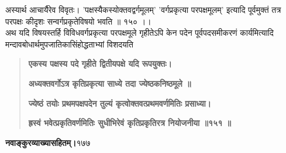 \documentclass[11pt, openany]{book}
\begin{document}
\begin{sloppypar}
\hangindent=0.2in \hspace{0.2in}अस्यार्थ आचार्यैरेव विवृतः। 'पक्षस्यैकस्योक्तवद्वर्गमूलम्' 'वर्गप्रकृत्या परपक्षमूलम्' इत्यादि पूर्वमुक्तं तत्र परपक्षः कीदृशः सन्वर्गप्रकृतेविषयो भवति ॥ १५० ।।\\

\hangindent=0.2in \hspace{0.2in}अथ यदि विषयस्तर्हि विविधवर्गप्रकृत्या परपक्षमूले गृहीतेऽपि केन पदेन पूर्वपदसमीकरणं कार्यमित्यादि मन्दावबोधार्थमुपजातिकासिंहोद्धताभ्यां विशदयति\textendash

\begin{quote}
\hspace{0.5in}\textbf{एकस्य पक्षस्य पदे गृहीते द्वितीयपक्षे यदि रूपयुक्तः।}

\hspace{0.5in}\textbf{अध्यक्तवर्गोऽत्र कृतिप्रकृत्या साध्ये तदा ज्येष्ठकनिष्ठमूले ॥}

\hspace{0.5in}\textbf{ज्येष्ठं तयोः प्रथमपक्षपदेन तुल्यं कृत्वोक्तवत्प्रथमवर्णमितिः प्रसाध्या।}

\hspace{0.4in}\textbf{ह्रस्वं भवेत्प्रकृतिवर्णमितिः सुधीभिरेवं कृतिप्रकृतिरत्र नियोजनीया ॥१५१ ॥}
\end{quote}
\end{sloppypar}
\thispagestyle{empty}
\newpage

\onehalfspacing
\hspace{2in}\textbf{नवाङ्कुरव्याख्यासहितम्।}\hspace{2in}१७७

\vspace{5mm}
\end{document}
